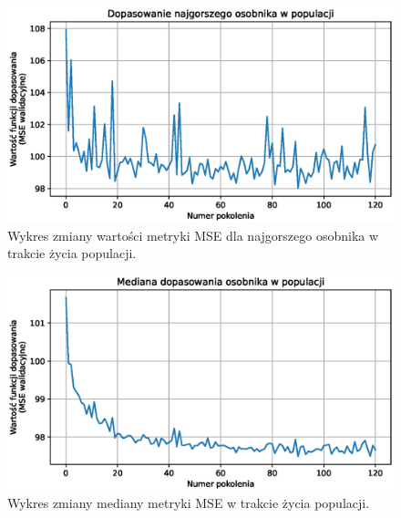 \documentclass[a4paper,12pt]{article}
\numberwithin{figure}{section}
\begin{document}
    \smallskip

    \begin{figure}[H]
        \centering
        \includegraphics[width=\textwidth]{g_a_worst_fitness}
        \caption{Wykres zmiany wartości metryki MSE dla najgorszego osobnika w trakcie życia populacji.}
        \label{fig:g_a_worst_fitness}
    \end{figure}

    \smallskip

    \begin{figure}[H]
        \centering
        \includegraphics[width=\textwidth]{g_a_mean_fitness}
        \caption{Wykres zmiany mediany metryki MSE w trakcie życia populacji.}
        \label{fig:g_a_mean_fitness}
    \end{figure}

    \smallskip
\end{document}
